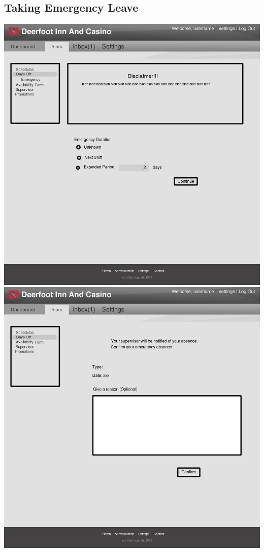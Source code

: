 \documentclass[letterpaper,12pt]{report}
\begin{document}
\begin{landscape}
\section{Taking Emergency Leave}
\begin{center}
 \includegraphics[scale=0.3]{prototypes/Screen7.png}
 \includegraphics[scale=0.3]{prototypes/Screen8.png}
\end{center}
\newpage


\end{landscape}
\end{document}
